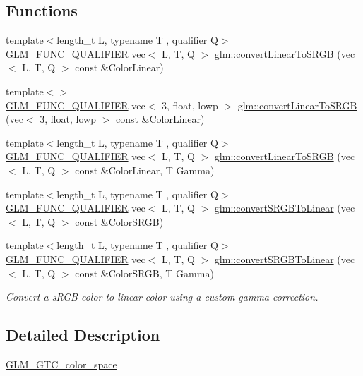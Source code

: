 \subsection*{Functions}
\begin{DoxyCompactItemize}
\item 
{\footnotesize template$<$length\+\_\+t L, typename T , qualifier Q$>$ }\\\hyperlink{setup_8hpp_a33fdea6f91c5f834105f7415e2a64407}{G\+L\+M\+\_\+\+F\+U\+N\+C\+\_\+\+Q\+U\+A\+L\+I\+F\+I\+ER} vec$<$ L, T, Q $>$ \hyperlink{group__gtc__color__space_ga42239e7b3da900f7ef37cec7e2476579}{glm\+::convert\+Linear\+To\+S\+R\+GB} (vec$<$ L, T, Q $>$ const \&Color\+Linear)
\item 
{\footnotesize template$<$$>$ }\\\hyperlink{setup_8hpp_a33fdea6f91c5f834105f7415e2a64407}{G\+L\+M\+\_\+\+F\+U\+N\+C\+\_\+\+Q\+U\+A\+L\+I\+F\+I\+ER} vec$<$ 3, float, lowp $>$ \hyperlink{namespaceglm_a45c5c68bea13598b1794da72b79dbb08}{glm\+::convert\+Linear\+To\+S\+R\+GB} (vec$<$ 3, float, lowp $>$ const \&Color\+Linear)
\item 
{\footnotesize template$<$length\+\_\+t L, typename T , qualifier Q$>$ }\\\hyperlink{setup_8hpp_a33fdea6f91c5f834105f7415e2a64407}{G\+L\+M\+\_\+\+F\+U\+N\+C\+\_\+\+Q\+U\+A\+L\+I\+F\+I\+ER} vec$<$ L, T, Q $>$ \hyperlink{group__gtc__color__space_gaace0a21167d13d26116c283009af57f6}{glm\+::convert\+Linear\+To\+S\+R\+GB} (vec$<$ L, T, Q $>$ const \&Color\+Linear, T Gamma)
\item 
{\footnotesize template$<$length\+\_\+t L, typename T , qualifier Q$>$ }\\\hyperlink{setup_8hpp_a33fdea6f91c5f834105f7415e2a64407}{G\+L\+M\+\_\+\+F\+U\+N\+C\+\_\+\+Q\+U\+A\+L\+I\+F\+I\+ER} vec$<$ L, T, Q $>$ \hyperlink{group__gtc__color__space_ga16c798b7a226b2c3079dedc55083d187}{glm\+::convert\+S\+R\+G\+B\+To\+Linear} (vec$<$ L, T, Q $>$ const \&Color\+S\+R\+GB)
\item 
{\footnotesize template$<$length\+\_\+t L, typename T , qualifier Q$>$ }\\\hyperlink{setup_8hpp_a33fdea6f91c5f834105f7415e2a64407}{G\+L\+M\+\_\+\+F\+U\+N\+C\+\_\+\+Q\+U\+A\+L\+I\+F\+I\+ER} vec$<$ L, T, Q $>$ \hyperlink{group__gtc__color__space_gad1b91f27a9726c9cb403f9fee6e2e200}{glm\+::convert\+S\+R\+G\+B\+To\+Linear} (vec$<$ L, T, Q $>$ const \&Color\+S\+R\+GB, T Gamma)
\begin{DoxyCompactList}\small\item\em Convert a s\+R\+GB color to linear color using a custom gamma correction. \end{DoxyCompactList}\end{DoxyCompactItemize}


\subsection{Detailed Description}
\hyperlink{group__gtc__color__space}{G\+L\+M\+\_\+\+G\+T\+C\+\_\+color\+\_\+space} 